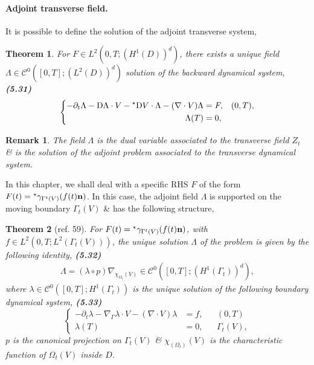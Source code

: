 \documentclass[oneside]{book}
\numberwithin{equation}{section}
\newtheorem{remark}{Remark}[chapter]
\newtheorem{theorem}{Theorem}[chapter]
\begin{document}
\paragraph{Adjoint transverse field.} It is possible to define the solution of the adjoint transverse system,

\begin{theorem}
	For $F\in L^2(0,T;(H^1(D))^d)$, there exists a unique field $\Lambda\in\mathcal{C}^0([0,T];(L^2(D))^d)$ solution of the backward dynamical system, \textbf{(5.31)}
	\begin{equation*}
		\left\{\begin{split}
			-\partial_t\Lambda - {\rm D}\Lambda\cdot V - {}^\star{\rm D}V\cdot\Lambda - (\nabla\cdot V)\Lambda &= F,&&(0,T),\\
			\Lambda(T) &= 0,
		\end{split}\right.
	\end{equation*}
\end{theorem}

\begin{remark}
	The field $\Lambda$ is the dual variable associated to the transverse field $Z_t$ \& is the solution of the adjoint problem associated to the transverse dynamical system.
\end{remark}
In this chapter, we shall deal with a specific RHS $F$ of the form $F(t) = {}^\star\gamma_{\Gamma^t(V)}(f(t){\bf n})$. In this case, the adjoint field $\Lambda$ is supported on the moving boundary $\Gamma_t(V)$ \& has the following structure,

\begin{theorem}[ref. 59]
	For $F(t) = {}^\star\gamma_{\Gamma^t(V)}(f(t){\bf n})$, with $f\in L^2(0,T;L^2(\Gamma_t(V)))$, the unique solution $\Lambda$ of the problem is given by the following identity, \textbf{(5.32)}
	\begin{align*}
		\Lambda = (\lambda\circ p)\nabla_{\chi_{\Omega_t}(V)}\in\mathcal{C}^0([0,T];(H^1(\Gamma_t))^d),
	\end{align*}
	where $\lambda\in\mathcal{C}^0([0,T];H^1(\Gamma_t))$ is the unique solution of the following boundary dynamical system, \textbf{(5.33)}
	\begin{equation*}
		\left\{\begin{split}
			-\partial_t\lambda - \nabla_\Gamma\lambda\cdot V - (\nabla\cdot V)\lambda &= f,&&(0,T)\\
			\lambda(T) &= 0,&&\Gamma_t(V),
		\end{split}\right.
	\end{equation*}
	$p$ is the canonical projection on $\Gamma_t(V)$ \& $\chi_(\Omega_t)(V)$ is the characteristic function of $\Omega_t(V)$ inside $D$.
\end{theorem}
\end{document}
